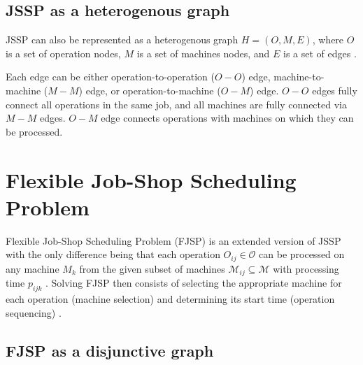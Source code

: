 \subsection{JSSP as a heterogenous graph} \label{JSSP as a heterogenous graph}

JSSP can also be represented as a heterogenous graph $H = (O, M, E)$, where $O$ is a set of operation nodes, $M$ is a set of machines nodes, and $E$ is a set of edges \cite{10226873}.
\par
Each edge can be either operation-to-operation ($O-O$) edge, machine-to-machine ($M-M$) edge, or operation-to-machine ($O-M$) edge. $O-O$ edges fully connect all operations in the same job, and all machines are fully connected via $M-M$ edges. $O-M$ edge connects operations with machines on which they can be processed.

\section{Flexible Job-Shop Scheduling Problem}

Flexible Job-Shop Scheduling Problem (FJSP) is an extended version of JSSP with the only difference being that each operation $O_{ij} \in \mathcal{O}$ can be processed on any machine $M_k$ from the given subset of machines $\mathcal{M}_{ij} \subseteq \mathcal{M}$ with processing time $p_{ijk}$ \cite{9826438}. Solving FJSP then consists of selecting the appropriate machine for each operation (machine selection) and determining its start time (operation sequencing) \cite{https://doi.org/10.1049/iet-cim.2018.0009}. 

\subsection{FJSP as a disjunctive graph} \label{FJSP as a disjunctive graph}


